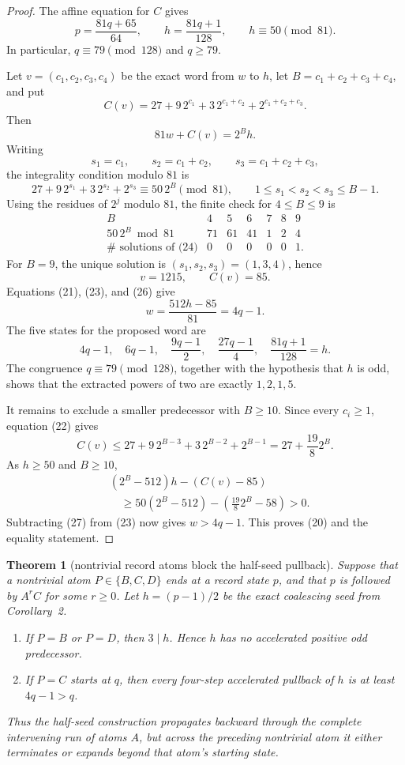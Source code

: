 \documentclass[11pt]{article}
\newtheorem{theorem}{Theorem}
\begin{document}
\begin{proof}
The affine equation for $C$ gives
\[
 p=\frac{81q+65}{64},
 \qquad
 h=\frac{81q+1}{128},
 \qquad
 h\equiv50\pmod {81}.
 \tag{21}
\]
In particular, $q\equiv79\pmod {128}$ and $q\geq79$.

Let $v=(c_1,c_2,c_3,c_4)$ be the exact word from $w$ to $h$, let
$B=c_1+c_2+c_3+c_4$, and put
\[
 C(v)=27+9\,2^{c_1}+3\,2^{c_1+c_2}
                  +2^{c_1+c_2+c_3}.
 \tag{22}
\]
Then
\[
 81w+C(v)=2^Bh.
 \tag{23}
\]
Writing
\[
 s_1=c_1,
 \qquad s_2=c_1+c_2,
 \qquad s_3=c_1+c_2+c_3,
\]
the integrality condition modulo $81$ is
\[
 27+9\,2^{s_1}+3\,2^{s_2}+2^{s_3}
 \equiv50\,2^B\pmod {81},
 \qquad
 1\leq s_1<s_2<s_3\leq B-1.
 \tag{24}
\]
Using the residues of $2^j$ modulo $81$, the finite check for
$4\leq B\leq9$ is
\[
\begin{array}{c|rrrrrr}
B&4&5&6&7&8&9\\ \hline
50\,2^B\bmod81&71&61&41&1&2&4\\
\#\text{ solutions of (24)}&0&0&0&0&0&1.
\end{array}
\tag{25}
\]
For $B=9$, the unique solution is
$(s_1,s_2,s_3)=(1,3,4)$, hence
\[
 v=1215,
 \qquad C(v)=85.
 \tag{26}
\]
Equations (21), (23), and (26) give
\[
 w=\frac{512h-85}{81}=4q-1.
 \tag{27}
\]
The five states for the proposed word are
\[
 4q-1,
 \quad 6q-1,
 \quad \frac{9q-1}{2},
 \quad \frac{27q-1}{4},
 \quad \frac{81q+1}{128}=h.
\]
The congruence $q\equiv79\pmod {128}$, together with the hypothesis that
$h$ is odd, shows that the extracted powers of two are exactly
$1,2,1,5$.

It remains to exclude a smaller predecessor with $B\geq10$.  Since every
$c_i\geq1$, equation (22) gives
\[
 C(v)
 \leq27+9\,2^{B-3}+3\,2^{B-2}+2^{B-1}
 =27+\frac{19}{8}2^B.
 \tag{28}
\]
As $h\geq50$ and $B\geq10$,
\[
\begin{aligned}
 &(2^B-512)h-(C(v)-85)\\
 &\quad\geq
 50(2^B-512)-\left(\frac{19}{8}2^B-58\right)>0.
\end{aligned}
\tag{29}
\]
Subtracting (27) from (23) now gives $w>4q-1$.  This proves (20) and the
equality statement.
\end{proof}

\begin{theorem}[nontrivial record atoms block the half-seed pullback]
Suppose that a nontrivial atom $P\in\{B,C,D\}$ ends at a record state
$p$, and that $p$ is followed by $A^rC$ for some $r\geq0$.  Let
$h=(p-1)/2$ be the exact coalescing seed from Corollary~2.
\begin{enumerate}
 \item If $P=B$ or $P=D$, then $3\mid h$.  Hence $h$ has no accelerated
 positive odd predecessor.
 \item If $P=C$ starts at $q$, then every four-step accelerated pullback
 of $h$ is at least $4q-1>q$.
\end{enumerate}
Thus the half-seed construction propagates backward through the complete
intervening run of atoms $A$, but across the preceding nontrivial atom it
either terminates or expands beyond that atom's starting state.
\end{theorem}
\end{document}
